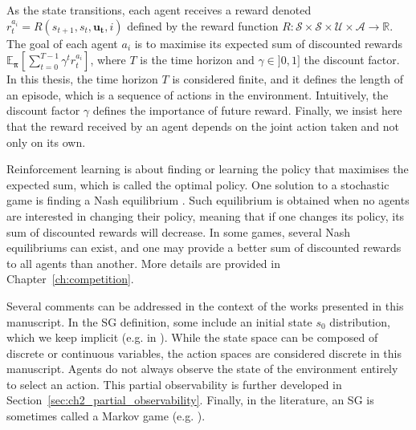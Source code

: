As the state transitions, each agent receives a reward denoted $r_t^{a_i} = R(s_{t+1}, s_t, \mathbf{u_t}, i)$ defined by the reward function $R: \mathcal{S} \times \mathcal{S} \times \mathcal{U} \times \mathcal{A} \rightarrow \mathbb{R}$.
The goal of each agent $a_i$ is to maximise its expected sum of discounted rewards $\mathbb{E}_{\mathbf{\pi}}\left[ \sum_{t=0}^{T-1} \gamma^t r^{a_i}_t \right]$, where $T$ is the time horizon and $\gamma \in ]0, 1]$ the discount factor.
In this thesis, the time horizon $T$ is considered finite, and it defines the length of an episode, which is a sequence of actions in the environment.
Intuitively, the discount factor $\gamma$ defines the importance of future reward.
Finally, we insist here that the reward received by an agent depends on the joint action taken and not only on its own.

Reinforcement learning is about finding or learning the policy that maximises the expected sum, which is called the optimal policy.
One solution to a stochastic game is finding a Nash equilibrium \citep{nash1950equilibrium}.
Such equilibrium is obtained when no agents are interested in changing their policy, meaning that if one changes its policy, its sum of discounted rewards will decrease.
In some games, several Nash equilibriums can exist, and one may provide a better sum of discounted rewards to all agents than another.
More details are provided in Chapter~\ref{ch:competition}.


Several comments can be addressed in the context of the works presented in this manuscript.
In the SG definition, some include an initial state $s_0$ distribution, which we keep implicit (e.g. in \citep{marl-book}).
While the state space can be composed of discrete or continuous variables, the action spaces are considered discrete in this manuscript.
Agents do not always observe the state of the environment entirely to select an action.
This partial observability is further developed in Section~\ref{sec:ch2_partial_observability}.
Finally, in the literature, an SG is sometimes called a Markov game (e.g. \citep{MarkovGames}).

